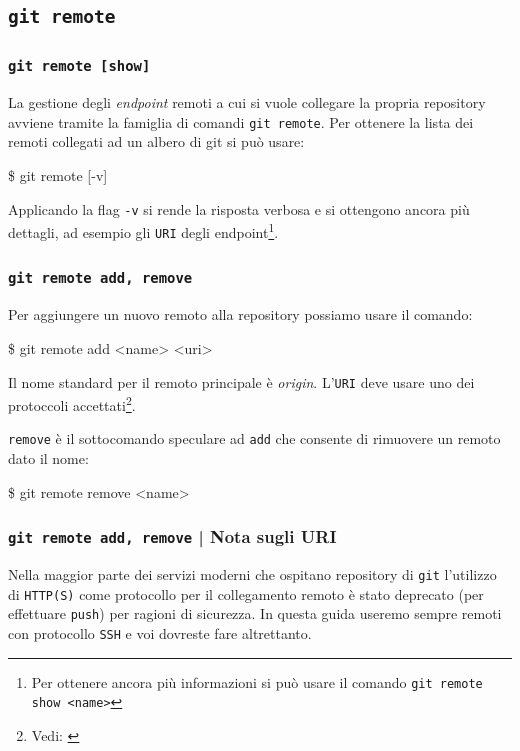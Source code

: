\documentclass{beamer}
\begin{document}
\subsection{\texttt{git remote}}
\begin{frame}
  \frametitle{\texttt{git remote [show]}}
  La gestione degli \emph{endpoint} remoti a cui si vuole collegare la propria
  repository avviene tramite la famiglia di comandi \texttt{git remote}.
  Per ottenere la lista dei remoti collegati ad un albero di git si pu\`o usare:
  \begin{semiverbatim}
  \$ git remote [-v]
  \end{semiverbatim}
  Applicando la flag \texttt{-v} si rende la risposta verbosa e si ottengono
  ancora pi\`u dettagli, ad esempio gli \texttt{URI} degli endpoint\footnote{
    Per ottenere ancora pi\`u informazioni si pu\`o usare il comando \texttt{git remote show <name>}
  }.
\end{frame}

\begin{frame}
  \frametitle{\texttt{git remote add, remove}}
  Per aggiungere un nuovo remoto alla repository possiamo usare il comando:
  \begin{semiverbatim}
  \$ git remote add <name> <uri>
  \end{semiverbatim}
  Il nome standard per il remoto principale \`e \emph{origin}. L'\texttt{URI}
  deve usare uno dei protoccoli accettati\footnote{Vedi:
    \href{https://stackoverflow.com/a/51112344}{}}.

    \pause
  \texttt{remove} \`e il sottocomando speculare ad \texttt{add} che consente di
  rimuovere un remoto dato il nome:
  \begin{semiverbatim}
  \$ git remote remove <name>
  \end{semiverbatim}
\end{frame}

\begin{frame}
  \frametitle{\texttt{git remote add, remove} | Nota sugli URI}
  Nella maggior parte dei servizi moderni che ospitano repository di \texttt{git}
  l'utilizzo di \texttt{HTTP(S)} come protocollo per il collegamento remoto \`e
  stato deprecato (per effettuare \texttt{push}) per ragioni di sicurezza. In
  questa guida useremo sempre remoti con protocollo \texttt{SSH} e voi dovreste
  fare altrettanto.
\end{frame}
\end{document}
